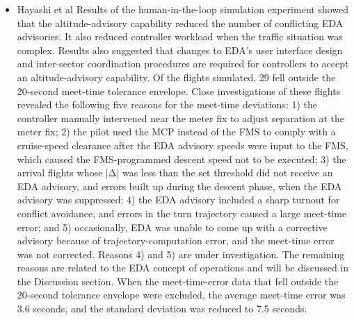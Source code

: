 \documentclass{aer1315-pretty}
\begin{document}
\begin{itemize}
\item Hayashi et al \cite{Hayashi:2011} 
Results of the human-in-the-loop simulation experiment showed that the altitude-advisory capability reduced the number of conflicting EDA advisories. It also reduced controller workload when the traffic situation was complex. Results also suggested that changes to EDA’s user interface design and inter-sector coordination procedures are required for controllers to accept an altitude-advisory capability.
Of the flights simulated, 29 fell outside the 20-second meet-time tolerance envelope. Close investigations of these flights revealed the following five reasons for the meet-time deviations: 1) the controller manually intervened near the meter fix to adjust separation at the meter fix; 2) the pilot used the MCP instead of the FMS to comply with a cruise-speed clearance after the EDA advisory speeds were input to the FMS, which caused the FMS-programmed descent speed not to be executed; 3) the arrival flights whose |Δ| was less than the set threshold did not receive an EDA advisory, and errors built up during the descent phase, when the EDA advisory was suppressed; 4) the EDA
advisory included a sharp turnout for conflict avoidance, and errors in the turn trajectory caused a large meet-time error; and 5) occasionally, EDA was unable to come up with a corrective advisory because of trajectory-computation error, and the meet-time error was not corrected. Reasons 4) and 5) are under investigation. The remaining reasons are related to the EDA concept of operations and will be discussed in the Discussion section. When the meet-time-error data that fell outside the 20-second tolerance envelope were excluded, the average meet-time error was 3.6 seconds, and the standard deviation was reduced to 7.5 seconds.



\end{itemize}
\end{document}
